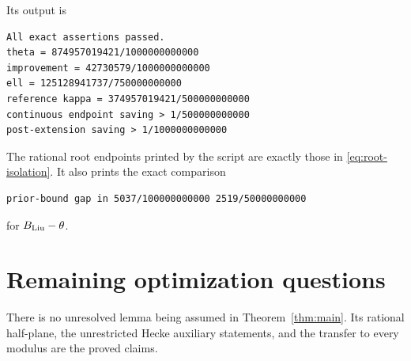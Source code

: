 \documentclass[12pt]{article}
\begin{document}
Its output is
\begin{verbatim}
All exact assertions passed.
theta = 874957019421/1000000000000
improvement = 42730579/1000000000000
ell = 125128941737/750000000000
reference kappa = 374957019421/500000000000
continuous endpoint saving > 1/500000000000
post-extension saving > 1/1000000000000
\end{verbatim}
The rational root endpoints printed by the script are exactly
those in \eqref{eq:root-isolation}.  It also prints the exact
comparison
\begin{verbatim}
prior-bound gap in 5037/100000000000 2519/50000000000
\end{verbatim}
for \(B_{\rm Liu}-\theta\).

\section{Remaining optimization questions}
There is no unresolved lemma being assumed in
Theorem~\ref{thm:main}.
Its rational half-plane, the unrestricted Hecke auxiliary statements,
and the transfer to every modulus are the proved claims.
\end{document}
